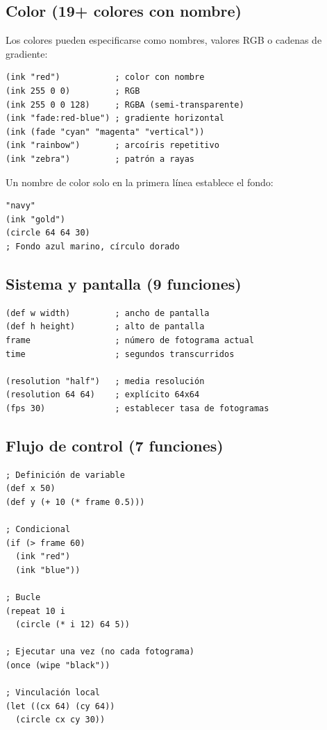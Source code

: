 \documentclass[10pt,letterpaper,twocolumn]{article}
\begin{document}
\subsection{Color (19+ colores con nombre)}

Los colores pueden especificarse como nombres, valores RGB o cadenas de gradiente:

\begin{lstlisting}
(ink "red")           ; color con nombre
(ink 255 0 0)         ; RGB
(ink 255 0 0 128)     ; RGBA (semi-transparente)
(ink "fade:red-blue") ; gradiente horizontal
(ink (fade "cyan" "magenta" "vertical"))
(ink "rainbow")       ; arcoíris repetitivo
(ink "zebra")         ; patrón a rayas
\end{lstlisting}

Un nombre de color solo en la primera línea establece el fondo:

\begin{lstlisting}
"navy"
(ink "gold")
(circle 64 64 30)
; Fondo azul marino, círculo dorado
\end{lstlisting}

\subsection{Sistema y pantalla (9 funciones)}

\begin{lstlisting}
(def w width)         ; ancho de pantalla
(def h height)        ; alto de pantalla
frame                 ; número de fotograma actual
time                  ; segundos transcurridos

(resolution "half")   ; media resolución
(resolution 64 64)    ; explícito 64x64
(fps 30)              ; establecer tasa de fotogramas
\end{lstlisting}

\subsection{Flujo de control (7 funciones)}

\begin{lstlisting}
; Definición de variable
(def x 50)
(def y (+ 10 (* frame 0.5)))

; Condicional
(if (> frame 60)
  (ink "red")
  (ink "blue"))

; Bucle
(repeat 10 i
  (circle (* i 12) 64 5))

; Ejecutar una vez (no cada fotograma)
(once (wipe "black"))

; Vinculación local
(let ((cx 64) (cy 64))
  (circle cx cy 30))
\end{lstlisting}
\end{document}
